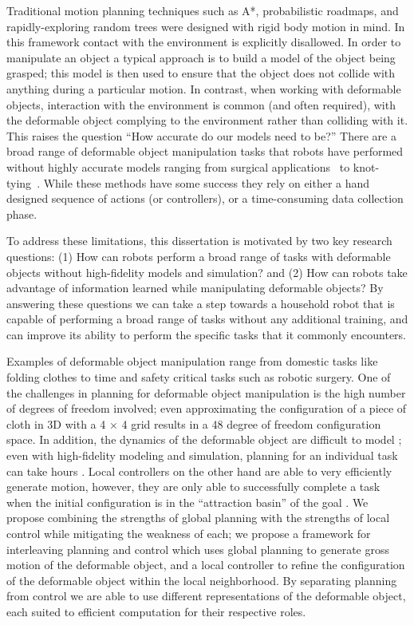 Traditional motion planning techniques such as A*, probabilistic roadmaps, and rapidly-exploring random trees were designed with rigid body motion in mind. In this framework contact with the environment is explicitly disallowed. In order to manipulate an object a typical approach is to build a model of the object being grasped; this model is then used to ensure that the object does not collide with anything during a particular motion. In contrast, when working with deformable objects, interaction with the environment is common (and often required), with the deformable object complying to the environment rather than colliding with it. This raises the question ``How accurate do our models need to be?'' There are a broad range of deformable object manipulation tasks that robots have performed without highly accurate models ranging from surgical applications~\cite{Wang2018} to knot-tying~\cite{Huang2015}. While these methods have some success they rely on either a hand designed sequence of actions (or controllers), or a time-consuming data collection phase.

To address these limitations, this dissertation is motivated by two key research questions: (1) How can robots perform a broad range of tasks with deformable objects without high-fidelity models and simulation? and (2) How can robots take advantage of information learned while manipulating deformable objects? By answering these questions we can take a step towards a household robot that is capable of performing a broad range of tasks without any additional training, and can improve its ability to perform the specific tasks that it commonly encounters.

Examples of deformable object manipulation range from domestic tasks like folding clothes to time and safety critical tasks such as robotic surgery. One of the challenges in planning for deformable object manipulation is the high number of degrees of freedom involved; even approximating the configuration of a piece of cloth in 3D with a 4 $\times$ 4 grid results in a 48 degree of freedom configuration space. In addition, the dynamics of the deformable object are difficult to model \cite{Essahbi2012}; even with high-fidelity modeling and simulation, planning for an individual task can take hours \cite{Bai2016}. Local controllers on the other hand are able to very efficiently generate motion, however, they are only able to successfully complete a task when the initial configuration is in the ``attraction basin'' of the goal \cite{Berenson2013, McConachie2018}. We propose combining the strengths of global planning with the strengths of local control while mitigating the weakness of each; we propose a framework for interleaving planning and control which uses global planning to generate gross motion of the deformable object, and a local controller to refine the configuration of the deformable object within the local neighborhood. By separating planning from control we are able to use different representations of the deformable object, each suited to efficient computation for their respective roles.

